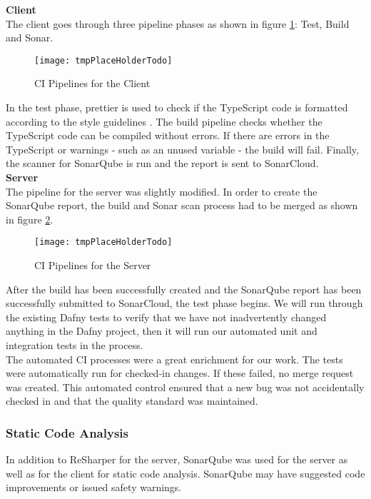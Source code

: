 {\bf Client}\\
The client goes through three pipeline phases as shown in figure \ref{fig:ci_client}: Test, Build and Sonar.

\begin{figure}[H]
    \centering
    \texttt{[image: tmpPlaceHolderTodo]}
    \caption{CI Pipelines for the Client}
    \label{fig:ci_client}
\end{figure}

In the test phase, prettier \cite{dev} is used to check if the TypeScript code
is formatted according to the style guidelines \cite{projectplan}.
The build pipeline checks whether the TypeScript code can be compiled without errors.
If there are errors in the TypeScript or warnings - such as an unused variable - the build will fail.
Finally, the scanner for SonarQube is run and the report is sent to SonarCloud. \\

{\bf Server}\\
The pipeline for the server was slightly modified.
In order to create the SonarQube report, the build and Sonar scan process had to be merged
as shown in figure \ref{fig:ci_server}.

\begin{figure}[H]
    \centering
    \texttt{[image: tmpPlaceHolderTodo]}
    \caption{CI Pipelines for the Server}
    \label{fig:ci_server}
\end{figure}

After the build has been successfully created
and the SonarQube report has been successfully submitted to SonarCloud,
the test phase begins.
We will run through the existing Dafny tests to verify
that we have not inadvertently changed anything in the Dafny project,
then it will run our automated unit and integration tests in the  process. \\

The automated CI processes were a great enrichment for our work.
The tests were automatically run for checked-in changes.
If these failed, no merge request was created.
This automated control ensured that a new bug was not accidentally checked in
and that the quality standard was maintained.

\subsubsection{Static Code Analysis}
In addition to ReSharper for the server, SonarQube was used for the server as well as for the client for static code analysis.
SonarQube may have suggested code improvements or issued safety warnings. \\

